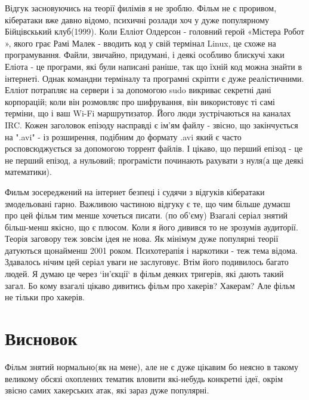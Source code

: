 \documentclass[a4paper,12pt]{article}
\begin{document}
    Відгук засновуючись на теорії филімів я не зроблю.
    Фільм не є проривом, кібератаки вже давно відомо, психичні розлади хоч у дуже популярному Бійцівскький клуб(1999).
    Коли Елліот Олдерсон - головний герой «Містера Робот », якого грає Рамі Малек - вводить код у свій термінал Linux,
    це схоже на програмування.
    Файли, звичайно, придумані, і деякі особливо блискучі хаки Еліота - це програми, які були написані раніше,
    так що їхній код можна знайти в інтернеті.
    Однак командни терміналу та програмні скріпти є дуже реалістичними.
    Елліот потрапляє на сервери і за допомогою sudo викриває секретні дані корпорацій; коли він розмовляє про шифрування,
    він використовує ті самі терміни, що і ваш Wi-Fi маршрутизатор.
    Його люди зустрічаються на каналах IRC. Кожен заголовок епізоду насправді є ім'ям файлу - звісно,
    що закінчується на ".avi" - із розширення, подібним до формату .avi який є часто росповсюджується за
    допомогою торрент файлів.
    І цікаво, що перший епізод - це не перший епізод, а нульовий; програмісти починають рахувати з нуля(а ще деякі математики).

    Фильм зосереджений на інтернет безпеці і судячи з відгуків кібератаки змодельовані гарно.
    Важливою частиною відгуку є те, що чим більше думаєш про цей фільм тим менше хочеться писати. (по об'єму)
    Взагалі серіал знятий більш-менш якісно, що є плюсом. Коли я його дивився то не зрозумів аудиторії.
    Теорія заговору теж зовсім ідея не нова. Як мінімум дуже популярні теорії датуються щонайменш 2001 роком.
    Психотерапія і наркотики - теж тема відома. Здавалось нічим цей серіал уваги не заслуговує.
    Втім його подивилось багато людей. Я думаю це через `ін'єкції` в фільм деяких тригерів, які дають такий загал.
    Бо кому взагалі цікаво дивитись фільм про хакерів? Хакерам? Але фільм не тільки про хакерів.

    \section{Висновок}
    Фільм знятий нормально(як на мене), але не є дуже цікавим бо неясно в такому великому обсязі охоплених тематик
    вловити які-небудь конкретні ідеї, окрім звісно самих хакерських атак, які зараз дуже популярні.
\end{document}
